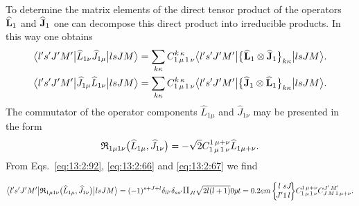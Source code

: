 To determine the matrix elements of the direct tensor product of the operators \(\widehat{\mathbf{L}}_{1}\) and \(\widehat{\mathbf{J}}_{1}\) one can decompose this direct product into irreducible products. In this way one obtains
\begin{align}
& 
\bigl\langle  l^{\prime} s^{\prime} J^{\prime} M^{\prime} \big|  \widehat{L}_{1 \nu} \widehat{J}_{1 \mu} \big| l s J M \bigr\rangle=\sum_{k \kappa} 
C_{1\,\mu\,1\,\nu}^{k\,\kappa}
\bigl\langle  l^{\prime} s^{\prime} J^{\prime} M^{\prime} \big| \bigl\{\widehat{\mathbf{L}}_{1} \otimes \widehat{\mathbf{J}}_{1}\bigr\}_{k \kappa} \big| l s J M \bigr\rangle .  \label{eq:13:2:90}\\
& 
\bigl\langle  l^{\prime} s^{\prime} J^{\prime} M^{\prime} \big|  \widehat{J}_{1 \mu} \widehat{L}_{1 \nu} \big| l s J M \bigr\rangle=\sum_{k \kappa} 
C_{1\,\mu\,1\,\nu}^{k\,\kappa}
\bigl\langle  l^{\prime} s^{\prime} J^{\prime} M^{\prime} \big| \bigl\{\widehat{\mathbf{J}}_{1} \otimes \widehat{\mathbf{L}}_{1}\bigr\}_{k \kappa} \big| l s J M \bigr\rangle . \label{eq:13:2:91}
\end{align}
The commutator of the operator components \(\widehat{L}_{1 \mu}\) and \(\widehat{J}_{1 \nu}\) may be presented in the form
\begin{equation}
\mathfrak{R}_{1 \mu 1 \nu}\bigl(\widehat{L}_{1 \mu}, \widehat{J}_{1 \nu}\bigr)=-\sqrt{2} 
C_{1\,\mu\,1\,\nu}^{1\,\mu+\nu} \widehat{L}_{1 \mu+\nu}. \label{eq:13:2:92}
\end{equation}
From Eqs.~\eqref{eq:13:2:92}, \eqref{eq:13:2:66} and \eqref{eq:13:2:67} we find

\begin{equation}
\braOket{ l^{\prime} s^{\prime} J^{\prime} M^{\prime}}{ \mathfrak{R}_{1 \mu 1 \nu}\bigl(\widehat{L}_{1 \mu}, \widehat{J}_{1 \nu}\bigr)}{l s J M}=(-1)^{s+J+l} \delta_{l l^{\prime}} \delta_{s s^{\prime}} \Fact{J l}\sqrt{2 l(l+1)}
\sixj{l}{s}{J}{J^{\prime}}{1}{l}
\clebsch{1}{\mu}{1}{\nu}{1}{\mu+\nu} 
\clebsch{J}{M}{1}{\mu+\nu}{J^{\prime}}{M^{\prime}}. \label{eq:13:2:93} 
\end{equation}

